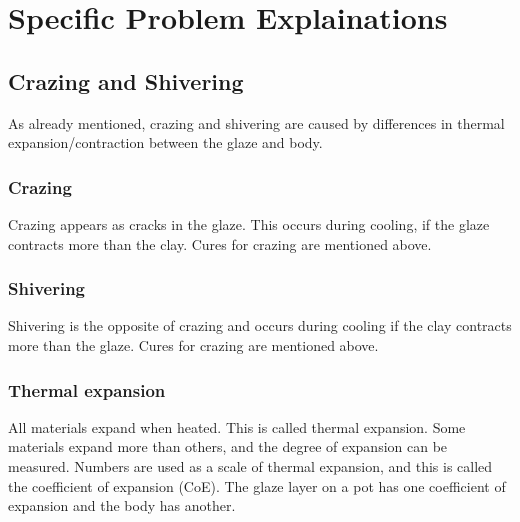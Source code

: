 \section{Specific Problem Explainations}
\subsection{Crazing and Shivering}
As already mentioned, crazing and shivering are caused by differences in 
thermal expansion/contraction between the glaze and body.
\subsubsection{Crazing}
Crazing appears as cracks in the glaze. This occurs during cooling, if the 
glaze contracts more than the clay. Cures for crazing are mentioned above.
\subsubsection{Shivering}
Shivering is the opposite of crazing and occurs during cooling if the clay 
contracts more than the glaze. Cures for crazing are mentioned above.
\subsubsection{Thermal expansion}
All materials expand when heated. This is called thermal expansion. Some 
materials expand more than others, and the degree of expansion can be measured. 
Numbers are used as a scale of thermal expansion, and this is called the 
coefficient of expansion (CoE). The glaze layer on a pot has one coefficient of 
expansion and the body has another.

